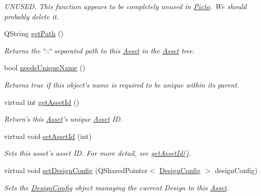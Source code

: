 \begin{DoxyCompactItemize}
\begin{DoxyCompactList}\small\item\em U\-N\-U\-S\-E\-D. This function appears to be completely unused in \hyperlink{namespace_picto}{Picto}. We should probably delete it. \end{DoxyCompactList}\item 
Q\-String \hyperlink{class_picto_1_1_asset_a310a0e5ffab1adff37039f27b998684a}{get\-Path} ()
\begin{DoxyCompactList}\small\item\em Returns the \char`\"{}\-::\char`\"{} separated path to this \hyperlink{class_picto_1_1_asset}{Asset} in the \hyperlink{class_picto_1_1_asset}{Asset} tree. \end{DoxyCompactList}\item 
bool \hyperlink{class_picto_1_1_asset_ad2b39292a4648dcdb9917f4bcf4bd658}{needs\-Unique\-Name} ()
\begin{DoxyCompactList}\small\item\em Returns true if this object's name is required to be unique within its parent. \end{DoxyCompactList}\item 
virtual int \hyperlink{class_picto_1_1_asset_a0b7664712f1479de7da32623bc47d6a8}{get\-Asset\-Id} ()
\begin{DoxyCompactList}\small\item\em Return's this \hyperlink{class_picto_1_1_asset}{Asset}'s unique \hyperlink{class_picto_1_1_asset}{Asset} I\-D. \end{DoxyCompactList}\item 
virtual void \hyperlink{class_picto_1_1_asset_a75ac07afb24b70da4885caef07855953}{set\-Asset\-Id} (int)
\begin{DoxyCompactList}\small\item\em Sets this asset's asset I\-D. For more detail, see \hyperlink{class_picto_1_1_asset_a0b7664712f1479de7da32623bc47d6a8}{get\-Asset\-Id()}. \end{DoxyCompactList}\item 
virtual void \hyperlink{class_picto_1_1_asset_ae5606ab47c82a89034689a9423fb4daa}{set\-Design\-Config} (Q\-Shared\-Pointer$<$ \hyperlink{class_picto_1_1_design_config}{Design\-Config} $>$ design\-Config)
\begin{DoxyCompactList}\small\item\em Sets the \hyperlink{class_picto_1_1_design_config}{Design\-Config} object managing the current Design to this \hyperlink{class_picto_1_1_asset}{Asset}. \end{DoxyCompactList}\item 

\end{DoxyCompactItemize}
